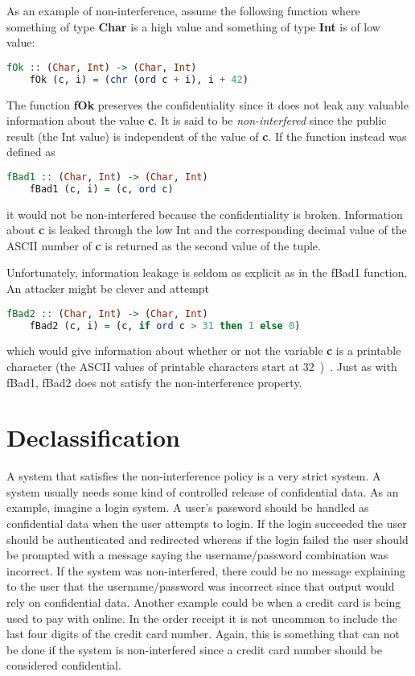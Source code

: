 As an example of non-interference, assume the following function where something of type \textbf{Char} is a high value and something of type \textbf{Int} is of low value:
\begin{center}
  \begin{lstlisting}[language=Haskell]
    fOk :: (Char, Int) -> (Char, Int)
    fOk (c, i) = (chr (ord c + i), i + 42)
  \end{lstlisting}
\end{center}
The function \textbf{fOk} preserves the confidentiality since it does not leak any valuable information about the value \textbf{c}. It is said to be \emph{non-interfered} since the public result (the Int value) is independent of the value of \textbf{c}. If the function instead was defined as
\begin{center}
  \begin{lstlisting}[language=Haskell]
    fBad1 :: (Char, Int) -> (Char, Int)
    fBad1 (c, i) = (c, ord c)
  \end{lstlisting}
\end{center}
it would not be non-interfered because the confidentiality is broken. Information about \textbf{c} is leaked through the low Int and the corresponding decimal value of the ASCII number of \textbf{c} is returned as the second value of the tuple.

Unfortunately, information leakage is seldom as explicit as in the fBad1 function. An attacker might be clever and attempt
\begin{center}
  \begin{lstlisting}[language=Haskell]
    fBad2 :: (Char, Int) -> (Char, Int)
    fBad2 (c, i) = (c, if ord c > 31 then 1 else 0)
  \end{lstlisting}
\end{center}
which would give information about whether or not the variable \textbf{c} is a printable character (the ASCII values of printable characters start at 32~\cite{ascii})~\cite{seclib}. Just as with fBad1, fBad2 does not satisfy the non-interference property.

\section{Declassification}
\label{chapter:declassification}
A system that satisfies the non-interference policy is a very strict system. A system usually needs some kind of controlled release of confidential data. As an example, imagine a login system. A user's password should be handled as confidential data when the user attempts to login. If the login succeeded the user should be authenticated and redirected whereas if the login failed the user should be prompted with a message saying the username/password combination was incorrect. If the system was non-interfered, there could be no message explaining to the user that the username/password was incorrect since that output would rely on confidential data. Another example could be when a credit card is being used to pay with online. In the order receipt it is not uncommon to include the last four digits of the credit card number. Again, this is something that can not be done if the system is non-interfered since a credit card number should be considered confidential.

